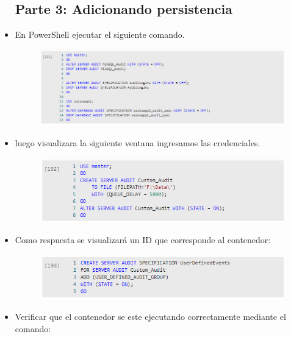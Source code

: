 \begin{itemize}
\subsection{Parte 3: Adicionando persistencia}
	\item En PowerShell ejecutar el siguiente comando.
                     \begin{figure}[H]
		\begin{center}
		\includegraphics[width=15cm]{./Imagenes/s19}
		\end{center}
		\end{figure}   
          \item luego visualizara la siguiente ventana  ingresamos las credenciales.
                     \begin{figure}[H]
		\begin{center}
		\includegraphics[width=15cm]{./Imagenes/s20}
		\end{center}
		\end{figure}   
	\item Como respuesta se visualizará un ID que corresponde al contenedor:
                     \begin{figure}[H]
		\begin{center}
		\includegraphics[width=15cm]{./Imagenes/s21}
		\end{center}
		\end{figure}   
	\item Verificar que el contenedor se este ejecutando correctamente mediante el comando:

\end{itemize}
